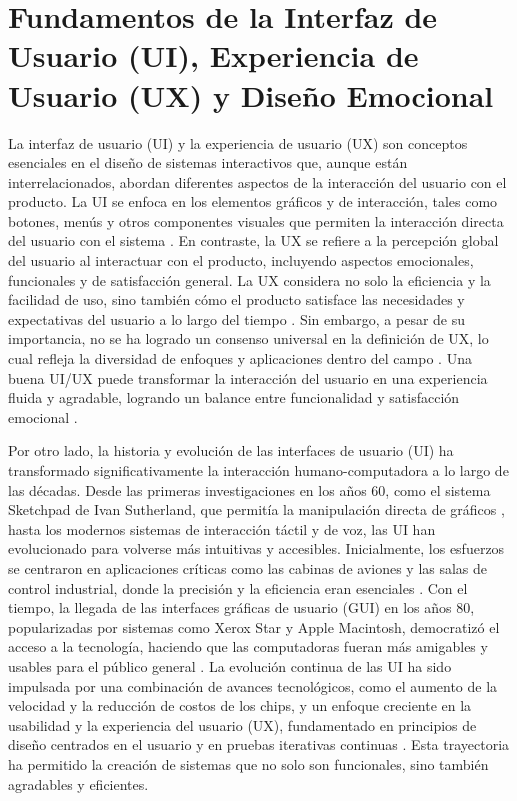 \section{Fundamentos de la Interfaz de Usuario (UI), Experiencia de Usuario (UX) y Diseño Emocional}

La interfaz de usuario (UI) y la experiencia de usuario (UX) son conceptos esenciales en el diseño de sistemas interactivos que, aunque están interrelacionados, abordan diferentes aspectos de la interacción del usuario con el producto. La UI se enfoca en los elementos gráficos y de interacción, tales como botones, menús y otros componentes visuales que permiten la interacción directa del usuario con el sistema \cite{ramadhanti_use_2023}. En contraste, la UX se refiere a la percepción global del usuario al interactuar con el producto, incluyendo aspectos emocionales, funcionales y de satisfacción general. La UX considera no solo la eficiencia y la facilidad de uso, sino también cómo el producto satisface las necesidades y expectativas del usuario a lo largo del tiempo \cite{hassenzahl_user_2006, berni_definition_2021}. Sin embargo, a pesar de su importancia, no se ha logrado un consenso universal en la definición de UX, lo cual refleja la diversidad de enfoques y aplicaciones dentro del campo \cite{hassenzahl_user_2006,berni_definition_2021}. Una buena UI/UX puede transformar la interacción del usuario en una experiencia fluida y agradable, logrando un balance entre funcionalidad y satisfacción emocional \cite{ramadhanti_use_2023, hassenzahl_user_2006, berni_definition_2021}.

Por otro lado, la historia y evolución de las interfaces de usuario (UI) ha transformado significativamente la interacción humano-computadora a lo largo de las décadas. Desde las primeras investigaciones en los años 60, como el sistema Sketchpad de Ivan Sutherland, que permitía la manipulación directa de gráficos \cite{myers_brief_1998}, hasta los modernos sistemas de interacción táctil y de voz, las UI han evolucionado para volverse más intuitivas y accesibles. Inicialmente, los esfuerzos se centraron en aplicaciones críticas como las cabinas de aviones y las salas de control industrial, donde la precisión y la eficiencia eran esenciales \cite{shneiderman_paradigm_2017}. Con el tiempo, la llegada de las interfaces gráficas de usuario (GUI) en los años 80, popularizadas por sistemas como Xerox Star y Apple Macintosh, democratizó el acceso a la tecnología, haciendo que las computadoras fueran más amigables y usables para el público general \cite{gould_how_1988}. La evolución continua de las UI ha sido impulsada por una combinación de avances tecnológicos, como el aumento de la velocidad y la reducción de costos de los chips, y un enfoque creciente en la usabilidad y la experiencia del usuario (UX), fundamentado en principios de diseño centrados en el usuario y en pruebas iterativas continuas \cite{jorgensen_taking_2008}. Esta trayectoria ha permitido la creación de sistemas que no solo son funcionales, sino también agradables y eficientes.

